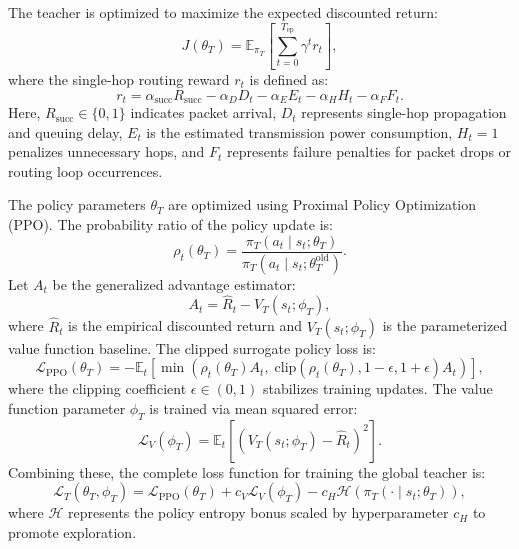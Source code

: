 The teacher is optimized to maximize the expected discounted return:
\begin{equation}
    J(\theta_T) = \mathbb{E}_{\pi_T} \left[ \sum_{t=0}^{T_{\mathrm{ep}}} \gamma^t r_t \right],
\end{equation}
where the single-hop routing reward $r_t$ is defined as:
\begin{equation}
    r_t = \alpha_{\mathrm{succ}}R_{\mathrm{succ}} - \alpha_D D_t - \alpha_E E_t - \alpha_H H_t - \alpha_F F_t.
\end{equation}
Here, $R_{\mathrm{succ}} \in \{0, 1\}$ indicates packet arrival, $D_t$ represents single-hop propagation and queuing delay, $E_t$ is the estimated transmission power consumption, $H_t = 1$ penalizes unnecessary hops, and $F_t$ represents failure penalties for packet drops or routing loop occurrences.

The policy parameters $\theta_T$ are optimized using Proximal Policy Optimization (PPO). The probability ratio of the policy update is:
\begin{equation}
    \rho_t(\theta_T) = \frac{\pi_T(a_t \mid s_t; \theta_T)}{\pi_T(a_t \mid s_t; \theta_T^{\mathrm{old}})}.
\end{equation}
Let $A_t$ be the generalized advantage estimator:
\begin{equation}
    A_t = \hat{R}_t - V_T(s_t; \phi_T),
\end{equation}
where $\hat{R}_t$ is the empirical discounted return and $V_T(s_t; \phi_T)$ is the parameterized value function baseline. The clipped surrogate policy loss is:
\begin{equation}
    \mathcal{L}_{\mathrm{PPO}}(\theta_T) = - \mathbb{E}_t \left[ \min \left( \rho_t(\theta_T)A_t, \; \mathrm{clip}(\rho_t(\theta_T), 1-\epsilon, 1+\epsilon)A_t \right) \right],
\end{equation}
where the clipping coefficient $\epsilon \in (0, 1)$ stabilizes training updates. The value function parameter $\phi_T$ is trained via mean squared error:
\begin{equation}
    \mathcal{L}_{V}(\phi_T) = \mathbb{E}_t \left[ \left( V_T(s_t; \phi_T) - \hat{R}_t \right)^2 \right].
\end{equation}
Combining these, the complete loss function for training the global teacher is:
\begin{equation}
    \mathcal{L}_{T}(\theta_T, \phi_T) = \mathcal{L}_{\mathrm{PPO}}(\theta_T) + c_V \mathcal{L}_{V}(\phi_T) - c_H \mathcal{H}(\pi_T(\cdot \mid s_t; \theta_T)),
\end{equation}
where $\mathcal{H}$ represents the policy entropy bonus scaled by hyperparameter $c_H$ to promote exploration.

